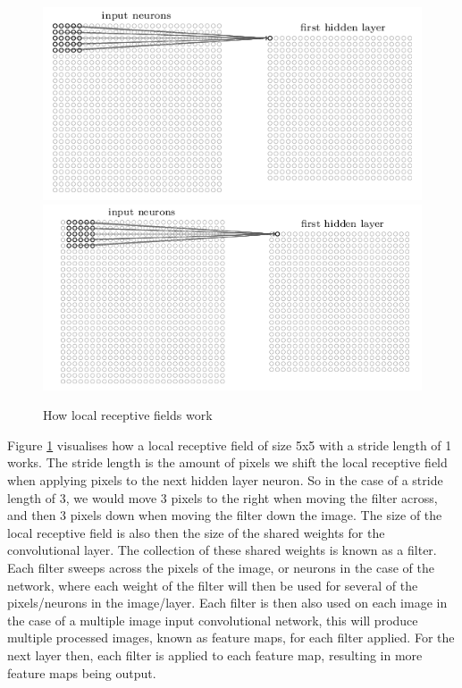 \documentclass[10pt]{article}
\begin{document}
		\begin{figure}[h]				
			\includegraphics[scale=0.55]{img/convNet1}
			\includegraphics[scale=0.55]{img/convNet2}
			\centering
			\caption{How local receptive fields work \cite{nndl}}
			\label{fig:lrf}
		\end{figure}
		Figure \ref{fig:lrf} visualises how a local receptive field of size 5x5 with a stride length of 1 works. The stride length is the amount of pixels we shift the local receptive field when applying pixels to the next hidden layer neuron. So in the case of a stride length of 3, we would move 3 pixels to the right when moving the filter across, and then 3 pixels down when moving the filter down the image. The size of the local receptive field is also then the size of the shared weights for the convolutional layer. The collection of these shared weights is known as a filter. Each filter sweeps across the pixels of the image, or neurons in the case of the network, where each weight of the filter will then be used for several of the pixels/neurons in the image/layer. Each filter is then also used on each image in the case of a multiple image input convolutional network, this will produce multiple processed images, known as feature maps, for each filter applied. For the next layer then, each filter is applied to each feature map, resulting in more feature maps being output.\\
		
\end{document}
